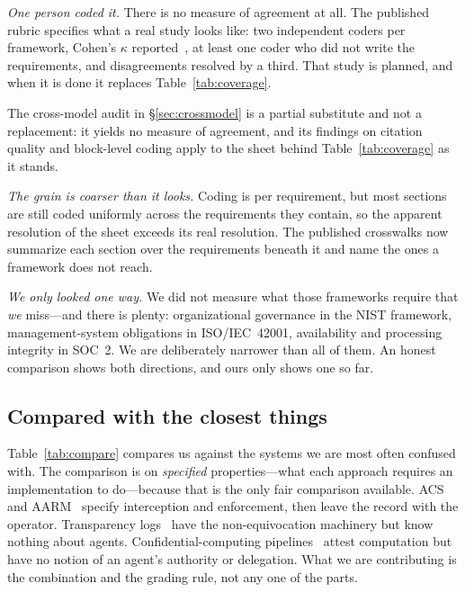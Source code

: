 \documentclass[11pt]{article}
\begin{document}
\emph{One person coded it.} There is no measure of agreement at all. The published rubric specifies what a
real study looks like: two independent coders per framework, Cohen's
$\kappa$ reported~\cite{cohen1960}, at least one coder who did not write the
requirements, and disagreements resolved by a third. That study is planned, and
when it is done it replaces Table~\ref{tab:coverage}.

The cross-model audit in \S\ref{sec:crossmodel} is a partial substitute and
not a replacement: it yields no measure of agreement, and its findings on
citation quality and block-level coding apply to the sheet behind
Table~\ref{tab:coverage} as it stands.

\emph{The grain is coarser than it looks.} Coding is per requirement, but most
sections are still coded uniformly across the requirements they contain, so the
apparent resolution of the sheet exceeds its real resolution. The published
crosswalks now summarize each section over the requirements beneath it and name
the ones a framework does not reach.

\emph{We only looked one way.} We did not measure what those frameworks
require that \emph{we} miss---and there is plenty: organizational governance
in the NIST framework, management-system obligations in ISO/IEC~42001,
availability and processing integrity in SOC~2. We are deliberately narrower
than all of them. An honest comparison shows both directions, and ours only
shows one so far.

\subsection{Compared with the closest things}
Table~\ref{tab:compare} compares us against the systems we are most often
confused with. The comparison is on \emph{specified} properties---what each
approach requires an implementation to do---because that is the only fair
comparison available. ACS and AARM~\cite{acs2026,acsms2026,csaaarm} specify
interception and enforcement, then leave the record with the operator.
Transparency logs~\cite{rfc6962,chainiac} have the non-equivocation machinery
but know nothing about agents. Confidential-computing pipelines~\cite{eqty2026}
attest computation but have no notion of an agent's authority or delegation.
What we are contributing is the combination and the grading rule, not any one
of the parts.
\end{document}
